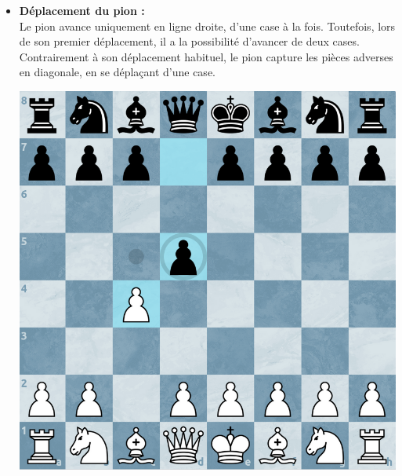 \documentclass{article}
\begin{document}
\begin{itemize}
    \item \begin{minipage}{0.45\textwidth}
        \textbf{Déplacement du pion :} \\
        Le pion avance uniquement en ligne droite, d'une case à la fois. Toutefois, lors de son premier déplacement, 
        il a la possibilité d'avancer de deux cases. Contrairement à son déplacement habituel, le pion capture les pièces
         adverses en diagonale, en se déplaçant d'une case.
    \end{minipage}
    \hspace{0.05\textwidth}
    \begin{minipage}{0.45\textwidth}
        \centering
        \includegraphics[width=\textwidth]{pionMove.png}
    \end{minipage}

    \vspace{0.5cm}


\end{itemize}
\end{document}
